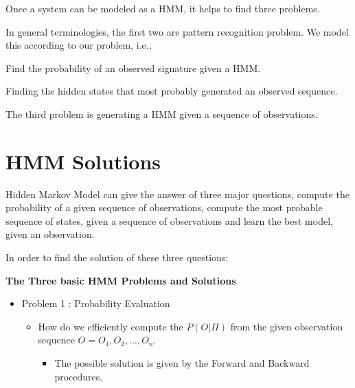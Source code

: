 Once a system can be modeled as a HMM, it helps to find three problems.

In general terminologies, the first two are pattern recognition problem. We model this according to our problem, i.e.,

\begin{tcolorbox}[width=\textwidth,colback={gray},title={Evaluation },colbacktitle=gray,coltitle=black]  

Find the probability of an observed signature given a HMM.  
\end{tcolorbox}


\begin{tcolorbox}[width=\textwidth,colback={gray},title={Decoding },colbacktitle=gray,coltitle=black]  

Finding the hidden states that most probably generated an observed sequence. 
\end{tcolorbox}

\begin{tcolorbox}[width=\textwidth,colback={gray},title={Learning },colbacktitle=gray,coltitle=black]  

The third problem is generating a HMM given a sequence of observations.
\end{tcolorbox}



\section{HMM Solutions}

Hidden Markov Model can give the answer of three major questions, compute the probability of a given sequence of observations, compute the most probable sequence of states, given a sequence of observations and learn the best model, given an observation.

In order to find the solution of these three questions:


\textbf{The Three basic HMM Problems and Solutions}

\begin{itemize}
\item Problem 1 : Probability Evaluation
 \begin{itemize}
 \item How do we efficiently compute the $P(O|\Pi)$ from the given observation sequence $O = {O_1, O_2,...,O_n}$.
 
  \begin{itemize}
  \item The possible solution is given by the Forward and Backward procedures.
  \end{itemize}
 \end{itemize}
\end{itemize}

